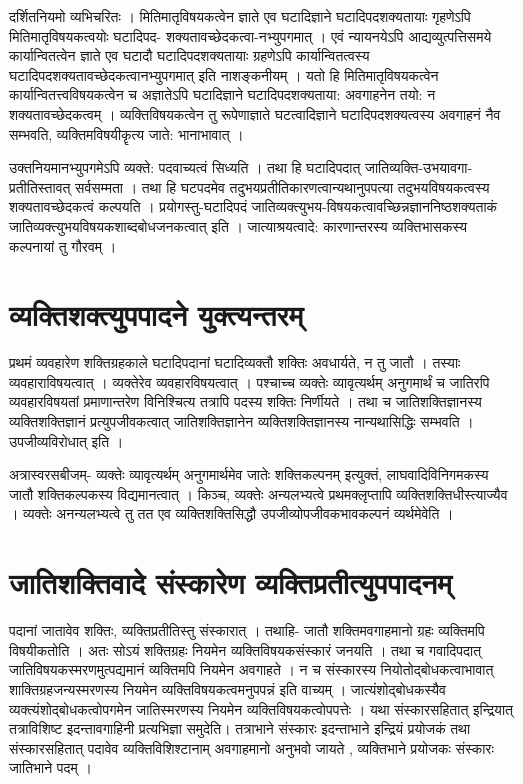 दर्शितनियमो व्यभिचरितः । मितिमातृविषयकत्वेन ज्ञाते एव घटादिज्ञाने घटादिपदशक्यतायाः गृहणेऽपि मितिमातृविषयकत्वयोः घटादिपद- शक्यतावच्छेदकत्वा-नभ्युपगमात् । एवं न्यायनयेऽपि आद्यव्युत्पत्तिसमये कार्यान्वितत्वेन ज्ञाते एव घटादौ घटादिपदशक्यतायाः ग्रहणेऽपि कार्यान्वितत्वस्य घटादिपदशक्यतावच्छेदकत्वानभ्युपगमात् इति नाशङ्कनीयम् । यतो हि मितिमातृविषयकत्वेन कार्यान्वितत्त्वविषयकत्वेन च अज्ञातेऽपि घटादिज्ञाने घटादिपदशक्यताया: अवगाहनेन तयो: न शक्यतावच्छेदकत्वम् । व्यक्तिविषयकत्वेन तु रूपेणाज्ञाते घटत्वादिज्ञाने घटादिपदशक्यत्वस्य अवगाहनं नैव सम्भवति, व्यक्तिमविषयीकॄत्य जाते: भानाभावात् । 

उक्तनियमानभ्युपगमेऽपि व्यक्ते: पदवाच्यत्वं सिध्यति । तथा हि घटादिपदात् जातिव्यक्ति-उभयावगा-प्रतीतिस्तावत् सर्वसम्मता । तथा हि घटपदमेव तदुभयप्रतीतिकारणत्वान्यथानुपपत्या तदुभयविषयकत्वस्य शक्यतावच्छेदकत्वं कल्पयति । प्रयोगस्तु-घटादिपदं जातिव्यक्त्युभय-विषयकत्वावच्छिन्नज्ञाननिष्ठशक्यताकं जातिव्यक्त्युभयविषयकशाब्दबोधजनकत्वात् इति । जात्याश्रयत्वादे: कारणान्तरस्य व्यक्तिभासकस्य कल्पनायां तु गौरवम् । 

\section*{व्यक्तिशक्त्युपपादने युक्त्यन्तरम्} 

प्रथमं व्यवहारेण शक्तिग्रहकाले घटादिपदानां घटादिव्यक्तौ शक्तिः अवधार्यते, न तु जातौ । तस्याः व्यवहाराविषयत्वात् । व्यक्तेरेव व्यवहारविषयत्वात् । पश्चाच्च व्यक्तेः व्यावृत्यर्थम् अनुगमार्थं च जातिरपि व्यवहारविषयतां प्रमाणान्तरेण विनिश्चित्य तत्रापि पदस्य शक्तिः निर्णीयते । तथा च जातिशक्तिज्ञानस्य व्यक्तिशक्तिज्ञानं प्रत्युपजीवकत्वात् जातिशक्तिज्ञानेन व्यक्तिशक्तिज्ञानस्य नान्यथासिद्धिः सम्भवति । उपजीव्यविरोधात् इति । 

अत्रास्वरसबीजम्- व्यक्तेः व्यावृत्यर्थम् अनुगमार्थमेव जातेः शक्तिकल्पनम् इत्युक्तं, लाघवादिविनिगमकस्य जातौ शक्तिकल्पकस्य विद्यमानत्वात् । किञ्च, व्यक्तेः अन्यलभ्यत्वे प्रथमक्लृप्तापि व्यक्तिशक्तिधीस्त्याज्यैव । व्यक्तेः अनन्यलभ्यत्वे तु तत एव व्यक्तिशक्तिसिद्धौ उपजीव्योपजीवकभावकल्पनं व्यर्थमेवेति । 

\section*{जातिशक्तिवादे संस्कारेण व्यक्तिप्रतीत्युपपादनम्}

पदानां जातावेव शक्तिः, व्यक्तिप्रतीतिस्तु संस्कारात् । तथाहि- जातौ शक्तिमवगाहमानो ग्रहः व्यक्तिमपि विषयीकतोति । अतः सोऽयं शक्तिग्रहः नियमेन व्यक्तिविषयकसंस्कारं जनयति । तथा च गवादिपदात् जातिविषयकस्मरणमुत्पद्यमानं व्यक्तिमपि नियमेन अवगाहते । न च संस्कारस्य नियोतोद्बोधकत्वाभावात् शाक्तिग्रहजन्यस्मरणस्य नियमेन व्यक्तिविषयकत्वमनुपपन्नं इति वाच्यम् । जात्यंशोद्बोधकस्यैव व्यक्त्यंशोद्बोधकत्वोपगमेन जातिस्मरणस्य नियमेन व्यक्तिविषयकत्वोपपत्तेः । यथा संस्कारसहितात् इन्द्रियात् तत्राविशिष्ट इदन्तावगाहिनी प्रत्यभिज्ञा  समुदेति। तत्राभाने संस्कारः इदन्ताभाने इन्द्रियं प्रयोजकं तथा संस्कारसहितात् पदावेव व्यक्तिविशिश्टानाम्  अवगाहमानो अनुभवो जायते , व्यक्तिभाने प्रयोजकः संस्कारः जातिभाने पदम् ।

